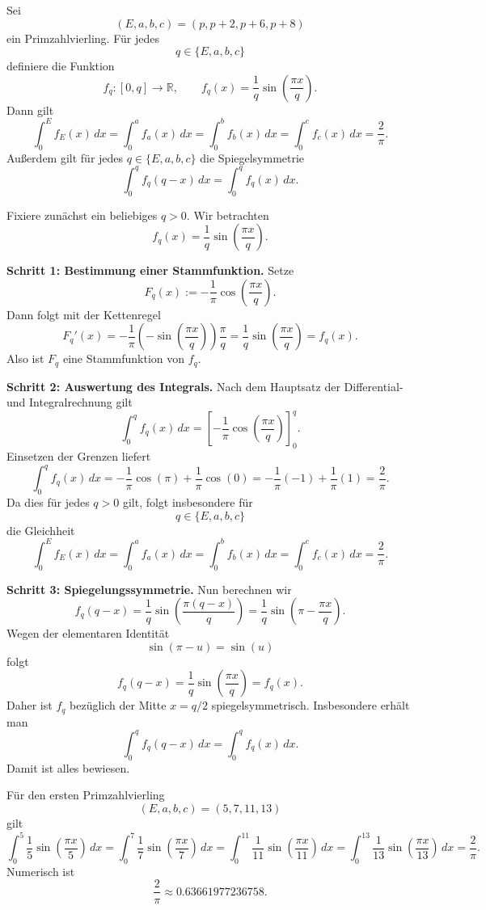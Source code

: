\begin{satz}
	Sei
	\[
	(E,a,b,c)=(p,p+2,p+6,p+8)
	\]
	ein Primzahlvierling. Für jedes
	\[
	q\in\{E,a,b,c\}
	\]
	definiere die Funktion
	\[
	f_q:[0,q]\to\mathbb{R},\qquad
	f_q(x)=\frac{1}{q}\sin\!\left(\frac{\pi x}{q}\right).
	\]
	Dann gilt
	\[
	\int_0^E f_E(x)\,dx
	=
	\int_0^a f_a(x)\,dx
	=
	\int_0^b f_b(x)\,dx
	=
	\int_0^c f_c(x)\,dx
	=
	\frac{2}{\pi}.
	\]
	Außerdem gilt für jedes \(q\in\{E,a,b,c\}\) die Spiegelsymmetrie
	\[
	\int_0^q f_q(q-x)\,dx=\int_0^q f_q(x)\,dx.
	\]
\end{satz}

\begin{beweis}
	Fixiere zunächst ein beliebiges \(q>0\). Wir betrachten
	\[
	f_q(x)=\frac{1}{q}\sin\!\left(\frac{\pi x}{q}\right).
	\]
	
	\textbf{Schritt 1: Bestimmung einer Stammfunktion.}
	Setze
	\[
	F_q(x):=-\frac{1}{\pi}\cos\!\left(\frac{\pi x}{q}\right).
	\]
	Dann folgt mit der Kettenregel
	\[
	F_q'(x)
	=
	-\frac{1}{\pi}\left(-\sin\!\left(\frac{\pi x}{q}\right)\right)\frac{\pi}{q}
	=
	\frac{1}{q}\sin\!\left(\frac{\pi x}{q}\right)
	=
	f_q(x).
	\]
	Also ist \(F_q\) eine Stammfunktion von \(f_q\).
	
	\textbf{Schritt 2: Auswertung des Integrals.}
	Nach dem Hauptsatz der Differential- und Integralrechnung gilt
	\[
	\int_0^q f_q(x)\,dx
	=
	\left[
	-\frac{1}{\pi}\cos\!\left(\frac{\pi x}{q}\right)
	\right]_0^q.
	\]
	Einsetzen der Grenzen liefert
	\[
	\int_0^q f_q(x)\,dx
	=
	-\frac{1}{\pi}\cos(\pi)+\frac{1}{\pi}\cos(0)
	=
	-\frac{1}{\pi}(-1)+\frac{1}{\pi}(1)
	=
	\frac{2}{\pi}.
	\]
	Da dies für jedes \(q>0\) gilt, folgt insbesondere für
	\[
	q\in\{E,a,b,c\}
	\]
	die Gleichheit
	\[
	\int_0^E f_E(x)\,dx
	=
	\int_0^a f_a(x)\,dx
	=
	\int_0^b f_b(x)\,dx
	=
	\int_0^c f_c(x)\,dx
	=
	\frac{2}{\pi}.
	\]
	
	\textbf{Schritt 3: Spiegelungssymmetrie.}
	Nun berechnen wir
	\[
	f_q(q-x)
	=
	\frac{1}{q}\sin\!\left(\frac{\pi(q-x)}{q}\right)
	=
	\frac{1}{q}\sin\!\left(\pi-\frac{\pi x}{q}\right).
	\]
	Wegen der elementaren Identität
	\[
	\sin(\pi-u)=\sin(u)
	\]
	folgt
	\[
	f_q(q-x)=\frac{1}{q}\sin\!\left(\frac{\pi x}{q}\right)=f_q(x).
	\]
	Daher ist \(f_q\) bezüglich der Mitte \(x=q/2\) spiegelsymmetrisch. Insbesondere erhält man
	\[
	\int_0^q f_q(q-x)\,dx=\int_0^q f_q(x)\,dx.
	\]
	Damit ist alles bewiesen.
\end{beweis}

\begin{korollar}
	Für den ersten Primzahlvierling
	\[
	(E,a,b,c)=(5,7,11,13)
	\]
	gilt
	\[
	\int_0^5 \frac{1}{5}\sin\!\left(\frac{\pi x}{5}\right)\,dx
	=
	\int_0^7 \frac{1}{7}\sin\!\left(\frac{\pi x}{7}\right)\,dx
	=
	\int_0^{11} \frac{1}{11}\sin\!\left(\frac{\pi x}{11}\right)\,dx
	=
	\int_0^{13} \frac{1}{13}\sin\!\left(\frac{\pi x}{13}\right)\,dx
	=
	\frac{2}{\pi}.
	\]
	Numerisch ist
	\[
	\frac{2}{\pi}\approx 0.63661977236758.
	\]
\end{korollar}


